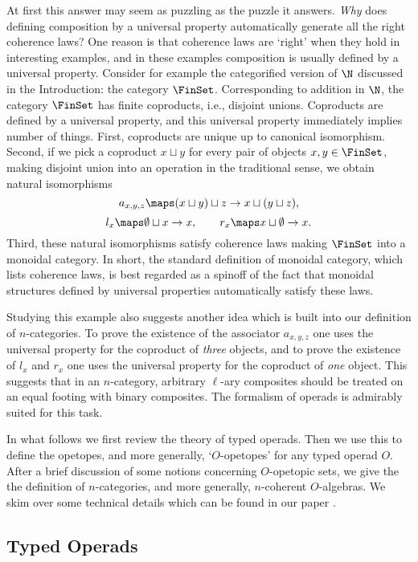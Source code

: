 At first this answer may seem as puzzling as the puzzle it answers.
{\it Why} does defining composition by a universal property
automatically generate all the right coherence laws?  One reason is that
coherence laws are `right' when they hold in interesting examples, and
in these examples composition is usually defined by a universal
property.  Consider for example the categorified version of $\N$
discussed in the Introduction: the category $\FinSet$.  Corresponding to
addition in $\N$, the category $\FinSet$ has finite coproducts, i.e.,
disjoint unions.  Coproducts are defined by a universal property, and
this universal property immediately implies number of things.  First,
coproducts are unique up to canonical isomorphism.  Second, if we pick a
coproduct $x \sqcup y$ for every pair of objects $x,y \in \FinSet$, making
disjoint union into an operation in the traditional sense, we obtain
natural isomorphisms
\[   a_{x,y,z}\maps (x \sqcup y) \sqcup z \to x \sqcup (y \sqcup z),  \]
\[                l_x \maps \emptyset \sqcup x \to x, \qquad 
            r_x \maps x \sqcup \emptyset \to x .\]
Third, these natural isomorphisms satisfy coherence laws making 
$\FinSet$ into a monoidal category.   In short, the standard definition 
of monoidal category, which lists coherence laws, is best regarded as a
spinoff of the fact that monoidal structures defined by universal
properties automatically satisfy these laws.   

Studying this example also suggests another idea which is built into our
definition of $n$-categories.  To prove the existence of the associator
$a_{x,y,z}$ one uses the universal property for the coproduct of {\it
three} objects, and to prove the existence of $l_x$ and $r_x$ one
uses the universal property for the coproduct of {\it one} object.
This suggests that in an $n$-category, arbitrary $\ell$-ary composites
should be treated on an equal footing with binary composites.  The
formalism of operads is admirably suited for this task.

In what follows we first review the theory of typed operads.   Then we
use this to define the opetopes, and more generally, `$O$-opetopes' for
any typed operad $O$.   After a brief discussion  of some notions
concerning $O$-opetopic sets, we give the the definition of
$n$-categories, and more generally, $n$-coherent $O$-algebras.  We skim
over some technical details which can be found in our paper \cite{BD2}.

\subsection{Typed Operads}

